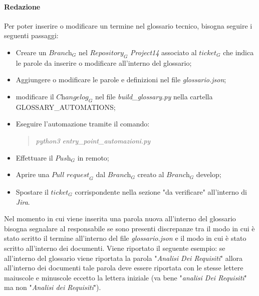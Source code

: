 \paragraph{Redazione}
Per poter inserire o modificare un termine nel glossario tecnico, bisogna seguire i seguenti passaggi:
\begin{itemize}
    \item Creare un $\textit{Branch}_G$ nel $\textit{Repository}_G$ \emph{Project14} associato al $\textit{ticket}_G$ che indica le parole da inserire o modificare all'interno del glossario;
    \item Aggiungere o modificare le parole e definizioni nel file \emph{glossario.json};
    \item modificare il $\textit{Changelog}_G$ nel file \emph{build\_glossary.py} nella cartella GLOSSARY\_AUTOMATIONS;
    \item Eseguire l'automazione tramite il comando:
        \begin{quote}
            \emph{  python3 entry\_point\_automazioni.py} 
        \end{quote}
    \item Effettuare il $\textit{Push}_G$ in remoto;
    \item Aprire una $\textit{Pull request}_G$ dal $\textit{Branch}_G$ creato al $\textit{Branch}_G$ develop;
    \item Spostare il $\textit{ticket}_G$ corrispondente nella sezione "da verificare" all'interno di \emph{Jira}.
\end{itemize}
Nel momento in cui viene inserita una parola nuova all'interno del glossario bisogna segnalare al responsabile se sono presenti discrepanze tra il modo in cui è stato scritto il termine all'interno del file \emph{glossario.json} e il modo in cui è stato scritto all'interno dei documenti. Viene riportato il seguente esempio: se all'interno del glossario viene riportata la parola "\emph{Analisi Dei Requisiti}" allora all'interno dei documenti tale parola deve essere riportata con le stesse lettere maiuscole e minuscole eccetto la lettera iniziale (va bene "\emph{analisi Dei Requisiti}" ma non "\emph{Analisi dei Requisiti}").
